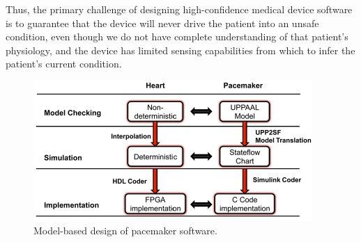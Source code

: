 Thus, the primary challenge of designing high-confidence medical device software is to guarantee that the device will never drive the patient into an unsafe condition,
even though we do not have complete understanding of that patient's physiology, and the device has limited sensing capabilities from which to infer the patient's current condition. 


%

\begin{figure}[t]
	\centering
	\includegraphics[scale=0.35]{figs/model_based_b.pdf}
	\caption{\small Model-based design of pacemaker software.}
	\label{fig:MBD}
\end{figure}
